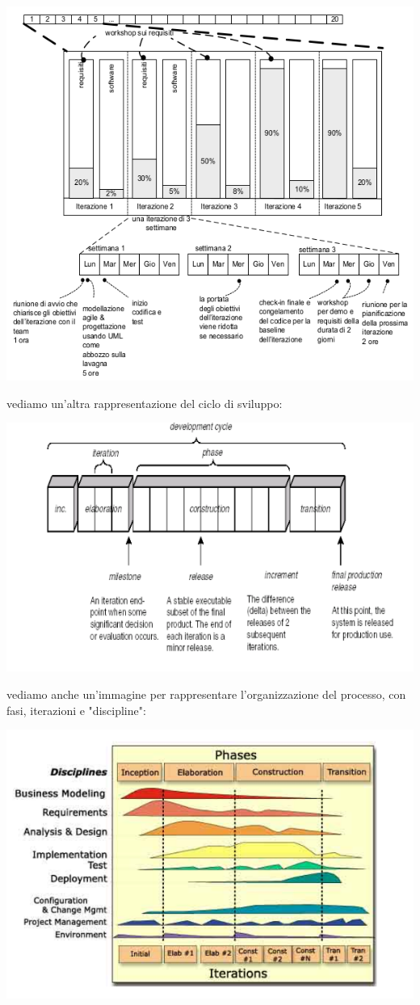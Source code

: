 \documentclass[a4paper,12pt, oneside]{book}
\begin{document}
\begin{center}
	\includegraphics[scale=0.7]{img/ms7.png}
\end{center}
\newpage
vediamo un'altra rappresentazione del ciclo di sviluppo:
\begin{center}
	\includegraphics[scale=0.65]{img/ms8.png}
\end{center}
vediamo anche un'immagine per rappresentare l'organizzazione del processo, con fasi, iterazioni e "discipline":
\begin{center}
	\includegraphics[scale=0.65]{img/ms9.png}
\end{center}
\end{document}
